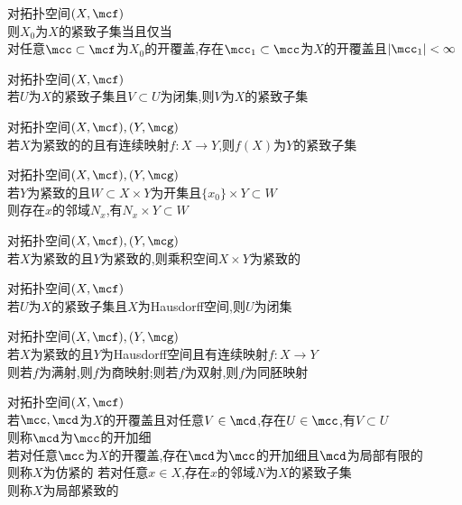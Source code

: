 \begin{dingli}
对拓扑空间$(X,\mcf)$\\
则$X_0$为$X$的紧致子集当且仅当\\
对任意$\mcc\subset\mcf$为$X_0$的开覆盖,存在$\mcc_{1}\subset\mcc$为$X$的开覆盖且$|\mcc_{1}|<\infty$
\end{dingli}

\begin{dingli}
对拓扑空间$(X,\mcf)$\\
若$U$为$X$的紧致子集且$V\subset U$为闭集,则$V$为$X$的紧致子集
\end{dingli}

\begin{dingli}
对拓扑空间$(X,\mcf),(Y,\mcg)$\\
若$X$为紧致的的且有连续映射$f:X\to Y$,则$f(X)$为$Y$的紧致子集
\end{dingli}

\begin{dingli}
对拓扑空间$(X,\mcf),(Y,\mcg)$\\
若$Y$为紧致的且$W\subset X\times Y$为开集且$\{x_0\}\times Y\subset W$\\
则存在$x$的邻域$N_{x}$,有$N_{x}\times Y\subset W$
\end{dingli}

\begin{dingli}
对拓扑空间$(X,\mcf),(Y,\mcg)$\\
若$X$为紧致的且$Y$为紧致的,则乘积空间$X\times Y$为紧致的
\end{dingli}

\begin{dingli}
对拓扑空间$(X,\mcf)$\\
若$U$为$X$的紧致子集且$X$为Hausdorff空间,则$U$为闭集
\end{dingli}

\begin{dingli}
对拓扑空间$(X,\mcf),(Y,\mcg)$\\
若$X$为紧致的且$Y$为Hausdorff空间且有连续映射$f:X\to Y$\\
则若$f$为满射,则$f$为商映射;则若$f$为双射,则$f$为同胚映射
\end{dingli}

\begin{dingyi}
对拓扑空间$(X,\mcf)$\\
若$\mcc,\mcd$为$X$的开覆盖且对任意$V\in\mcd$,存在$U\in\mcc$,有$V\subset U$\\
则称$\mcd$为$\mcc$的开加细\\
若对任意$\mcc$为$X$的开覆盖,存在$\mcd$为$\mcc$的开加细且$\mcd$为局部有限的\\
则称$X$为仿紧的
若对任意$x\in X$,存在$x$的邻域$N$为$X$的紧致子集\\
则称$X$为局部紧致的
\end{dingyi}

